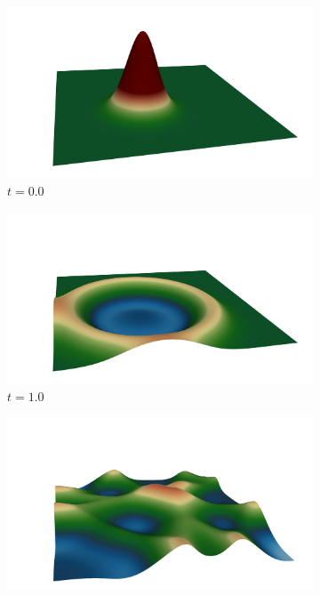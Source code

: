 \begin{figure}
\begin{center}
\begin{subfigure}[t]{0.49\textwidth}
\includegraphics[trim={4cm 0cm 2cm 2cm},clip,width=1.0\linewidth]{figs/swe/h_t0.png}
\caption{$t=0.0$}
\end{subfigure}
\begin{subfigure}[t]{0.49\textwidth}
\includegraphics[trim={4cm 0cm 2cm 2cm},clip,width=1.0\linewidth]{figs/swe/h_t1.png}
\caption{$t=1.0$}
\end{subfigure}
\begin{subfigure}[t]{0.49\textwidth}
\includegraphics[trim={4cm 0cm 2cm 2cm},clip,width=1.0\linewidth]{figs/swe/h_t3.png}

\end{subfigure}
\end{center}
\end{figure}
